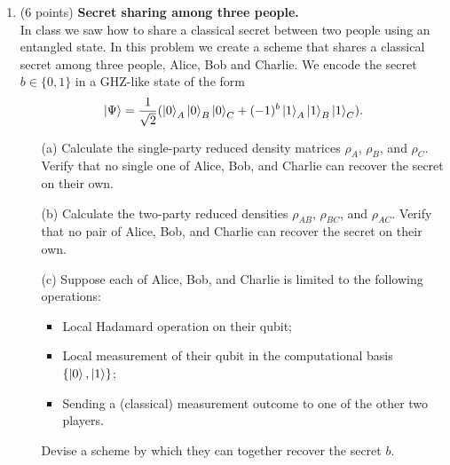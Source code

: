 \documentclass[12pt]{article}
\begin{document}
\begin{enumerate}
\item (6 points) \textbf{Secret sharing among three people.}\\
In class we saw how to share a classical secret between two people using an entangled state. In this problem we create a scheme that shares a classical secret among three people, Alice, Bob and Charlie. We encode the secret $b\in \{0,1\}$ in a GHZ-like state of the form
\[
\ket{\Psi} = \frac{1}{\sqrt{2}}(\ket{0}_A\ket{0}_B\ket{0}_C+ (-1)^b\ket{1}_A\ket{1}_B\ket{1}_C).
\]
\begin{enumerate}
\item[(a)] Calculate the single-party reduced density matrices $\rho_A$, $\rho_B$, and $\rho_C$. Verify that no single one of Alice, Bob, and Charlie can recover the secret on their own.
\item[(b)] Calculate the two-party reduced densities $\rho_{AB}$, $\rho_{BC}$, and $\rho_{AC}$. Verify that no pair of Alice, Bob, and Charlie can recover the secret on their own.
\item[(c)] Suppose each of Alice, Bob, and Charlie is limited to the following operations:
	\begin{itemize}
	\item Local Hadamard operation on their qubit;
	\item Local measurement of their qubit in the computational basis $\{\ket{0},\ket{1}\}$;
	\item Sending a (classical) measurement outcome to one of the other two players.
	\end{itemize}
Devise a scheme by which they can together recover the secret $b$. 
\end{enumerate}





\end{enumerate}
\end{document}

